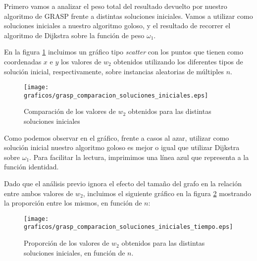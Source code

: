 Primero vamos a analizar el peso total del resultado devuelto por nuestro algoritmo de GRASP frente a distintas soluciones iniciales. Vamos a utilizar como soluciones iniciales a nuestro algoritmo goloso, y el resultado de recorrer el algoritmo de Dijkstra sobre la función de peso $\omega_1$.

En la figura \ref{fig:grasp-soluciones-iniciales} incluimos un gráfico tipo \emph{scatter} con los puntos que tienen como coordenadas $x$ e $y$ los valores de $w_2$ obtenidos utilizando los diferentes tipos de solución inicial, respectivamente, sobre instancias aleatorias de múltiples $n$.

\begin{figure}[H]
  \begin{center}
    \begin{minipage}{0.7\linewidth}
      \texttt{[image: graficos/grasp\_comparacion\_soluciones\_iniciales.eps]}
      \caption{Comparación de los valores de $w_2$ obtenidos para las distintas soluciones iniciales}\label{fig:grasp-soluciones-iniciales}
    \end{minipage}
  \end{center}
\end{figure}

Como podemos observar en el gráfico, frente a casos al azar, utilizar como solución inicial nuestro algoritmo goloso es mejor o igual que utilizar Dijkstra sobre $\omega_1$. Para facilitar la lectura, imprimimos una línea azul que representa a la función identidad.

Dado que el análisis previo ignora el efecto del tamaño del grafo en la relación entre ambos valores de $w_2$, incluimos el siguiente gráfico en la figura \ref{fig:grasp-soluciones-iniciales-tiempo} mostrando la proporción entre los mismos, en función de $n$:

\begin{figure}[H]
  \begin{center}
    \begin{minipage}{0.7\linewidth}
      \texttt{[image: graficos/grasp\_comparacion\_soluciones\_iniciales\_tiempo.eps]}
      \caption{Proporción de los valores de $w_2$ obtenidos para las distintas soluciones iniciales, en función de $n$.}\label{fig:grasp-soluciones-iniciales-tiempo}
    \end{minipage}
  \end{center}
\end{figure}


